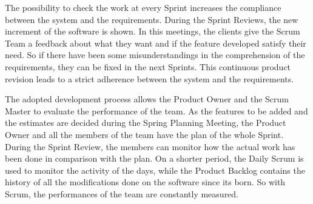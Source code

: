 		The possibility to check the work at every Sprint increases the compliance between the system and the requirements. During the Sprint Reviews, the new increment of the software is shown. In this meetings, the clients give the Scrum Team a feedback about what they want and if the feature developed satisfy their need. So if there have been some misunderstandings in the comprehension of the requirements, they can be fixed in the next Sprints. This continuous product revision leads to a strict adherence between the system and the requirements.

		The adopted development process allows the Product Owner and the Scrum Master to evaluate the performance of the team. As the features to be added and the estimates are decided during the Spring Planning Meeting, the Product Owner and all the members of the team have the plan of the whole Sprint. During the Sprint Review, the members can monitor how the actual work has been done in comparison with the plan. On a shorter period, the Daily Scrum is used to monitor the activity of the days, while the Product Backlog contains the history of all the modifications done on the software since its born. So with Scrum, the performances of the team are constantly measured.
		
			

